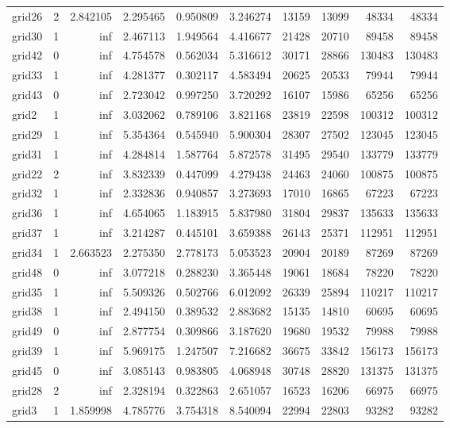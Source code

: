 \begin{longtable}{|l|r|r|r|r|r|r|r|r|r|}
grid26 & 2 & 2.842105 & 2.295465 & 0.950809 & 3.246274 & 13159 & 13099 & 48334 & 48334 \\
grid30 & 1 & inf & 2.467113 & 1.949564 & 4.416677 & 21428 & 20710 & 89458 & 89458 \\
grid42 & 0 & inf & 4.754578 & 0.562034 & 5.316612 & 30171 & 28866 & 130483 & 130483 \\
grid33 & 1 & inf & 4.281377 & 0.302117 & 4.583494 & 20625 & 20533 & 79944 & 79944 \\
grid43 & 0 & inf & 2.723042 & 0.997250 & 3.720292 & 16107 & 15986 & 65256 & 65256 \\
grid2 & 1 & inf & 3.032062 & 0.789106 & 3.821168 & 23819 & 22598 & 100312 & 100312 \\
grid29 & 1 & inf & 5.354364 & 0.545940 & 5.900304 & 28307 & 27502 & 123045 & 123045 \\
grid31 & 1 & inf & 4.284814 & 1.587764 & 5.872578 & 31495 & 29540 & 133779 & 133779 \\
grid22 & 2 & inf & 3.832339 & 0.447099 & 4.279438 & 24463 & 24060 & 100875 & 100875 \\
grid32 & 1 & inf & 2.332836 & 0.940857 & 3.273693 & 17010 & 16865 & 67223 & 67223 \\
grid36 & 1 & inf & 4.654065 & 1.183915 & 5.837980 & 31804 & 29837 & 135633 & 135633 \\
grid37 & 1 & inf & 3.214287 & 0.445101 & 3.659388 & 26143 & 25371 & 112951 & 112951 \\
grid34 & 1 & 2.663523 & 2.275350 & 2.778173 & 5.053523 & 20904 & 20189 & 87269 & 87269 \\
grid48 & 0 & inf & 3.077218 & 0.288230 & 3.365448 & 19061 & 18684 & 78220 & 78220 \\
grid35 & 1 & inf & 5.509326 & 0.502766 & 6.012092 & 26339 & 25894 & 110217 & 110217 \\
grid38 & 1 & inf & 2.494150 & 0.389532 & 2.883682 & 15135 & 14810 & 60695 & 60695 \\
grid49 & 0 & inf & 2.877754 & 0.309866 & 3.187620 & 19680 & 19532 & 79988 & 79988 \\
grid39 & 1 & inf & 5.969175 & 1.247507 & 7.216682 & 36675 & 33842 & 156173 & 156173 \\
grid45 & 0 & inf & 3.085143 & 0.983805 & 4.068948 & 30748 & 28820 & 131375 & 131375 \\
grid28 & 2 & inf & 2.328194 & 0.322863 & 2.651057 & 16523 & 16206 & 66975 & 66975 \\
grid3 & 1 & 1.859998 & 4.785776 & 3.754318 & 8.540094 & 22994 & 22803 & 93282 & 93282 \\

\end{longtable}
